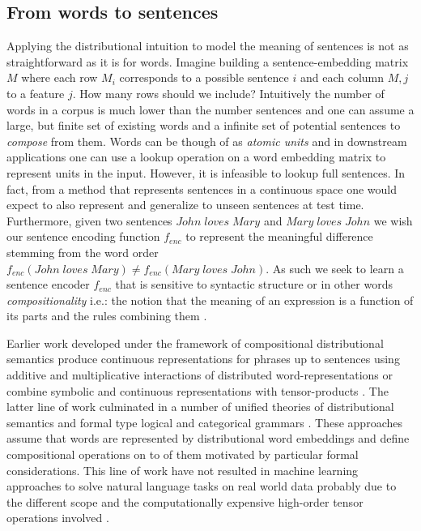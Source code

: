 \subsection{From words to sentences}
\label{sec:sentences}
Applying the distributional intuition to model the meaning of sentences is not as straightforward
as it is for words.
Imagine building a sentence-embedding matrix $M$ where each row $M_i$ corresponds to
a possible sentence $i$ and each column $M,j$ to a feature $j$.
How many rows should we include? Intuitively the number of words in a corpus is much
lower than the number sentences and one can assume a large, but finite set
of existing words and a infinite set of
potential sentences to \emph{compose} from them.
Words can be though of as \emph{atomic units} and
in downstream applications one can use a lookup operation on a word embedding matrix
to represent units in the input. However, it is infeasible to lookup full sentences.
In fact, from a method that represents sentences in a continuous space one would expect
to also represent and generalize to unseen sentences at test time.
Furthermore, given two sentences $\mathit{John \; loves \; Mary}$ and
$\mathit{Mary \; loves \; John}$ we wish our sentence encoding function
$f_{enc}$ to represent the meaningful difference stemming from the word order
$f_{enc}(\mathit{John \; loves \; Mary}) \neq f_{enc}(\mathit{Mary \; loves \; John})$.
As such we seek to learn a sentence encoder $f_{enc}$ that is sensitive to
syntactic structure or in other words \emph{compositionality} i.e.:
the notion that the meaning of an expression is
a function of its parts and the rules combining them \cite{montague1970english}.

Earlier work developed under the framework of compositional distributional semantics produce
continuous representations for phrases up to sentences using additive and multiplicative interactions
of distributed word-representations \cite{mitchell2008vector} or combine symbolic and
continuous representations with tensor-products \cite{clark2007combining}.
The latter line of work culminated in a number of unified theories of
distributional semantics and formal type logical and categorical grammars
\cite{coecke2010mathematical,clarke2012context,baroni2014frege}.
These approaches assume that words are represented by distributional word embeddings
and define compositional operations on to of them motivated by particular formal
considerations. This line of work have not resulted in
machine learning approaches to solve natural language tasks
on real world data probably due to the different scope and
the computationally expensive high-order
tensor operations involved \cite{bowman2016modeling}.

